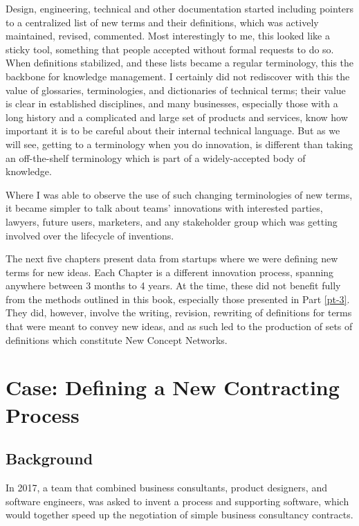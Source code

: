 \documentclass[graybox,envcountchap,sectrefs]{svmono}
\newcommand{\ncnf}{New Concept Network}
\begin{document}
Design, engineering, technical and other documentation started including pointers to a centralized list of new terms and their definitions, which was actively maintained, revised, commented. Most interestingly to me, this looked like a sticky tool, something that people accepted without formal requests to do so. When definitions stabilized, and these lists became a regular terminology, this the backbone for knowledge management. I certainly did not rediscover with this the value of glossaries, terminologies, and dictionaries of technical terms; their value is clear in established disciplines, and many businesses, especially those with a long history and a complicated and large set of products and services, know how important it is to be careful about their internal technical language. But as we will see, getting to a terminology when you do innovation, is different than taking an off-the-shelf terminology which is part of a widely-accepted body of knowledge.

Where I was able to observe the use of such changing terminologies of new terms, it became simpler to talk about teams' innovations with interested parties, lawyers, future users, marketers, and any stakeholder group which was getting involved over the lifecycle of  inventions.

The next five chapters present data from startups where we were defining new terms for new ideas. Each Chapter is a different innovation process, spanning anywhere between 3 months to 4 years. At the time, these did not benefit fully from the methods outlined in this book, especially those presented in Part \ref{pt-3}. They did, however, involve the writing, revision, rewriting of definitions for terms that were meant to convey new ideas, and as such led to the production of sets of definitions which constitute \ncnf s.

\printbibliography


\chapter{Case: Defining a New Contracting Process}\label{c:case:contracting-process}

\section{Background}
In 2017, a team that combined business consultants, product designers, and software engineers, was asked to invent a process and supporting software, which would together speed up the negotiation of simple business consultancy contracts. 
\end{document}
